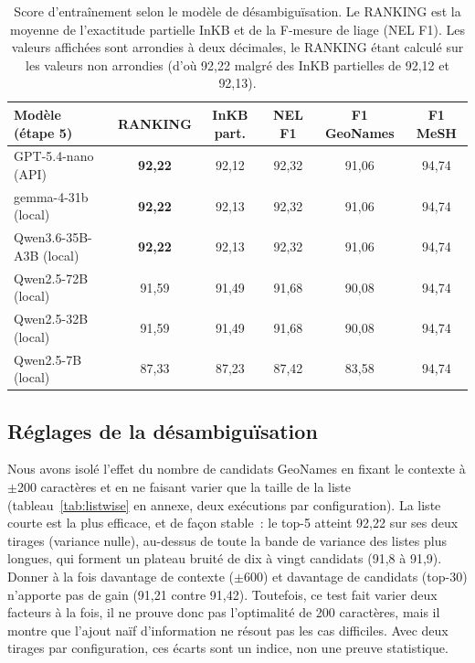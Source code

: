 \documentclass[10pt,twoside]{article}
\begin{document}
\begin{table}[!h]
\centering
\small
\setlength{\tabcolsep}{4.5pt}
\begin{tabular}{lccccc}
\toprule
Modèle (étape 5) & RANKING & InKB part. & NEL F1 & F1 GeoNames & F1 MeSH \\
\midrule
GPT-5.4-nano (API) & \textbf{92,22} & 92,12 & 92,32 & 91,06 & 94,74 \\
gemma-4-31b (local) & \textbf{92,22} & 92,13 & 92,32 & 91,06 & 94,74 \\
Qwen3.6-35B-A3B (local) & \textbf{92,22} & 92,13 & 92,32 & 91,06 & 94,74 \\
\midrule
Qwen2.5-72B (local) & 91,59 & 91,49 & 91,68 & 90,08 & 94,74 \\
Qwen2.5-32B (local) & 91,59 & 91,49 & 91,68 & 90,08 & 94,74 \\
Qwen2.5-7B (local) & 87,33 & 87,23 & 87,42 & 83,58 & 94,74 \\
\bottomrule
\end{tabular}
\caption{Score d'entraînement selon le modèle de désambiguïsation. Le RANKING est la moyenne de
l'exactitude partielle InKB et de la F-mesure de liage (NEL F1). Les
valeurs affichées sont arrondies à deux décimales, le RANKING étant calculé sur les valeurs non
arrondies (d'où 92,22 malgré des InKB partielles de 92,12 et 92,13).}
\label{tab:plateau}
\end{table}

\subsection{Réglages de la désambiguïsation}
Nous avons isolé l'effet du nombre de candidats GeoNames en fixant le contexte à $\pm$200
caractères et en ne faisant varier que la taille de la liste (tableau~\ref{tab:listwise} en
annexe, deux exécutions par configuration). La liste courte est la plus efficace, et de façon stable~: le top-5
atteint 92,22 sur ses deux tirages (variance nulle), au-dessus de toute la bande de variance des
listes plus longues, qui forment un plateau bruité de dix à vingt candidats (91,8 à 91,9). Donner à la fois davantage de contexte ($\pm$600) et davantage de
candidats (top-30) n'apporte pas de gain (91,21 contre 91,42). Toutefois, ce test fait varier deux facteurs à la
fois, il ne prouve donc pas l'optimalité de 200 caractères, mais il montre que l'ajout naïf
d'information ne résout pas les cas difficiles. Avec deux tirages par configuration, ces écarts sont
un indice, non une preuve statistique.
\end{document}

